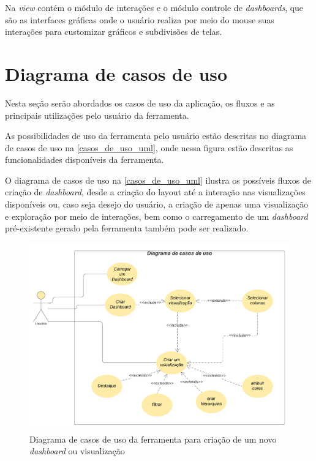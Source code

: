 \documentclass[
	12pt,				%
	openright,			%
	oneside,			%
	a4paper,			%
	english,			%
	brazil				%
	]{abntex2}
\begin{document}
Na \textit{view} contém o módulo de interações e o módulo controle de \textit{dashboards}, que são as interfaces gráficas onde o usuário realiza por meio do mouse suas interações para customizar gráficos e subdivisões de telas.



\section{Diagrama de casos de uso}
Nesta seção serão abordados os casos de uso da aplicação, os fluxos e as principais utilizações pelo usuário da ferramenta.

As possibilidades de uso da ferramenta pelo usuário estão descritas no diagrama de casos de uso na \autoref{casos_de_uso_uml}, onde nessa figura estão descritas as funcionalidades disponíveis da ferramenta.

O diagrama de casos de uso na \autoref{casos_de_uso_uml} ilustra os possíveis fluxos de criação de \textit{dashboard}, desde a criação do layout até a interação nas visualizações disponíveis ou, caso seja desejo do usuário, a criação de apenas uma visualização e exploração por meio de interações, bem como o carregamento de um \textit{dashboard} pré-existente gerado pela ferramenta também pode ser realizado.

\begin{figure}
	\caption{\label{casos_de_uso_uml}Diagrama de casos de uso da ferramenta para criação de um novo \textit{dashboard} ou visualização }
	\begin{center}
	    \includegraphics[width=35pc]{figures/Diagrama de casos de uso.pdf}
	\end{center}
\end{figure}
\end{document}

